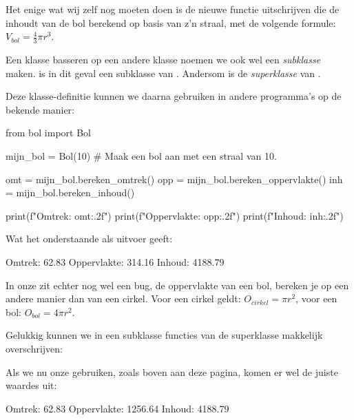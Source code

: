 Het enige wat wij zelf nog moeten doen is de nieuwe functie uitschrijven die de inhoudt van de bol berekend op basis van z'n straal, met de volgende formule: $V_{bol} = \frac{4}{3} \pi r^3$. \newline

\begin{remark}
Een klasse basseren op een andere klasse noemen we ook wel een \textit{subklasse} maken.  is in dit geval een subklasse van . Andersom is  de \textit{superklasse} van .
\end{remark}

Deze klasse-definitie kunnen we daarna gebruiken in andere programma's op de bekende manier:
\begin{python}
from bol import Bol

mijn_bol = Bol(10)  # Maak een bol aan met een straal van 10.

omt = mijn_bol.bereken_omtrek()
opp = mijn_bol.bereken_oppervlakte()
inh = mijn_bol.bereken_inhoud()

print(f"Omtrek: {omt:.2f}")
print(f"Oppervlakte: {opp:.2f}")
print(f"Inhoud: {inh:.2f}")
\end{python}

Wat het onderstaande als uitvoer geeft:
\begin{python}
Omtrek: 62.83
Oppervlakte: 314.16
Inhoud: 4188.79
\end{python}

In onze  zit echter nog wel een bug, de oppervlakte van een bol, bereken je op een andere manier dan van een cirkel. Voor een cirkel geldt: $O_{cirkel} = \pi r^2$, voor een bol: $O_{bol} = 4\pi r^2$. \newline

Gelukkig kunnen we in een subklasse functies van de superklasse makkelijk overschrijven:

Als we nu onze  gebruiken, zoals boven aan deze pagina, komen er wel de juiste waardes uit:
\begin{python}
Omtrek: 62.83
Oppervlakte: 1256.64
Inhoud: 4188.79
\end{python}


